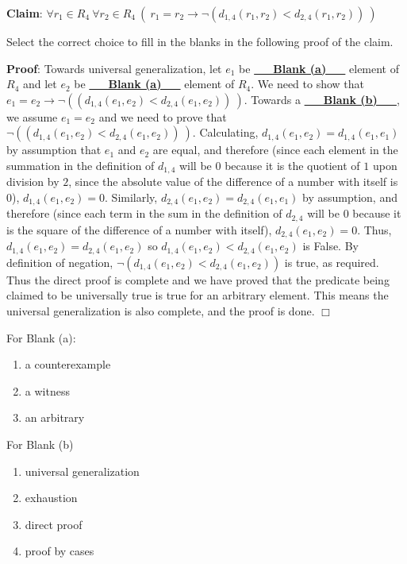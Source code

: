 \documentclass[12pt, oneside]{article}
\begin{document}
\begin{enumerate}
{\bf Claim}: $\forall r_1 \in R_4 ~\forall r_2 \in R_4 ~(~r_1 = r_2 \to \neg \left( d_{1,4}(r_1,r_2) < d_{2,4} (r_1,r_2) \right)~)$

Select the correct choice to fill in the blanks in the following proof of the claim.

{\bf Proof}: Towards universal generalization, let $e_1$ be \underline{{\bf ~~~Blank (a)~~~}} element of $R_4$ and 
let $e_2$ be \underline{{\bf~~~Blank (a)~~~}} element of $R_4$.  We need to show that 
$e_1 = e_2 \to \neg ( \left( d_{1,4}(e_1,e_2) < d_{2,4} (e_1,e_2) \right)~)$.  Towards a \underline{\bf ~~~Blank (b)~~~}, we 
assume $e_1 = e_2$ and we need to prove that $\neg ( \left( d_{1,4}(e_1,e_2) < d_{2,4} (e_1,e_2) \right)~)$.
Calculating, $d_{1,4}(e_1,e_2) = d_{1,4}(e_1,e_1)$ by assumption that $e_1$ and $e_2$ are equal, and therefore (since 
each element in the summation in the definition of $d_{1,4}$ will be $0$ because it
is the quotient of $1$ upon division by $2$, since the absolute value of the difference of a number
with itself is $0$), 
$d_{1,4}(e_1,e_2) = 0$. Similarly, $d_{2,4} (e_1,e_2) = d_{2,4} (e_1,e_1)$ by assumption, and therefore
(since each term in the sum in the definition of $d_{2,4}$ will be $0$ because it is the square of the difference of a number
with itself), $d_{2,4} ( e_1,e_2) = 0$. Thus, $d_{1,4}(e_1,e_2) = d_{2,4}(e_1,e_2)$ so $d_{1,4}(e_1,e_2) < d_{2,4}(e_1,e_2)$ is False.  By definition of negation, $\lnot (d_{1,4}(e_1,e_2) < d_{2,4}(e_1,e_2) )$ is true, as required.
Thus the direct proof is complete and we have proved that the predicate being claimed to be universally 
true is true for an arbitrary element.  This means the universal generalization is also complete, and the proof is done. 
$\Box$

\begin{multicols}{2}
For Blank (a): 
\begin{enumerate}[label=\roman*.]
\item a counterexample
\item a witness
\item an arbitrary
\end{enumerate}

\columnbreak

For Blank (b)
\begin{enumerate}[label=\roman*.]
\item universal generalization
\item exhaustion
\item direct proof
\item proof by cases
\end{enumerate}
\end{multicols}


\end{enumerate}
\end{document}
